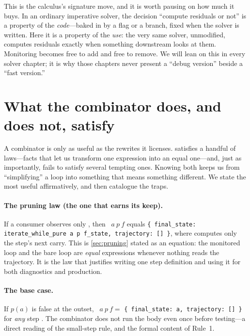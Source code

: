 This is the calculus's signature move, and it is worth pausing on how much it
buys. In an ordinary imperative solver, the decision ``compute residuals or not''
is a property of the \emph{code}---baked in by a flag or a branch, fixed when the
solver is written. Here it is a property of the \emph{use}: the very same solver,
unmodified, computes residuals exactly when something downstream looks at them.
Monitoring becomes free to add and free to remove. We will lean on this in every
solver chapter; it is why those chapters never present a ``debug version'' beside
a ``fast version.''

\section{What the combinator does, and does not, satisfy}
\label{sec:laws}

A combinator is only as useful as the rewrites it licenses. 
satisfies a handful of laws---facts that let us transform one expression into an
equal one---and, just as importantly, fails to satisfy several tempting ones.
Knowing both keeps us from ``simplifying'' a loop into something that means
something different. We state the most useful affirmatively, and then catalogue
the traps.

\paragraph{The pruning law (the one that earns its keep).} If a consumer observes
only , then ~$a~p~f$ equals
\lstinline[style=l4style]|{ final_state: iterate_while_pure a p f_state, trajectory: [] }|,
where  computes only the step's next carry. This is
\cref{sec:pruning} stated as an equation: the monitored loop and the bare loop are
\emph{equal} expressions whenever nothing reads the trajectory. It is the law
that justifies writing one step definition and using it for both diagnostics and
production.

\paragraph{The base case.} If $p(a)$ is false at the outset,
~$a~p~f = $
\lstinline[style=l4style]|{ final_state: a, trajectory: [] }| for \emph{any}
step . The combinator does not run the body even once before testing---a
direct reading of the small-step rule, and the formal content of Rule~1.

